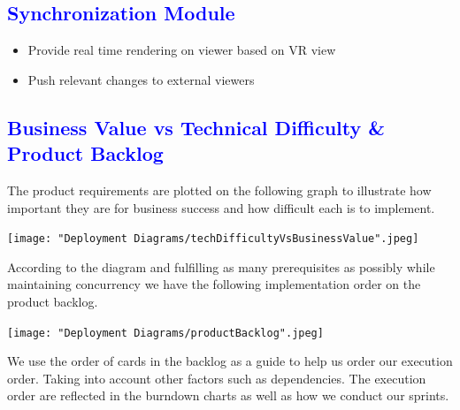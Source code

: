 \documentclass[12pt]{article}
\begin{document}
\begin{flushleft}
	\textcolor{blue}{\subsection{Synchronization Module}}	
	\begin{flushleft}
	\begin{itemize}
	\item Provide real time rendering on viewer based on VR view
	\item Push relevant changes to external viewers
	\end{itemize}	
	\end{flushleft}

\end{flushleft}

\textcolor{blue}{\section{Business Value vs Technical Difficulty \& Product Backlog}}
\begin{flushleft}
 	
 	The product requirements are plotted on the following graph to illustrate how important they are for business success and how difficult each is to implement.
	
	\texttt{[image: "Deployment Diagrams/techDifficultyVsBusinessValue".jpeg]}
	
	According to the diagram and fulfilling as many prerequisites as possibly while maintaining concurrency we have the following implementation order on the product backlog.
	
	\texttt{[image: "Deployment Diagrams/productBacklog".jpeg]}

\end{flushleft}

\begin{flushleft}

	We use the order of cards in the backlog as a guide to help us order our execution order. Taking into account other factors such as dependencies. The execution order are reflected in the burndown charts as well as how we conduct our sprints.
	
\end{flushleft}
\end{document}
